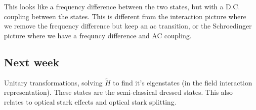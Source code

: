 This looks like a frequency difference between the two states, but with a D.C. coupling between the states. This is different from the interaction picture where we remove the frequency difference but keep an ac transition, or the Schroedinger picture where we have a frequncy difference and AC coupling.
\subsection{Next week}
Unitary transformations, solving $\tilde{H}$ to find it's eigenstates (in the field interaction representation). These states are the semi-classical dressed states. This also relates to optical stark effects and optical stark splitting.
